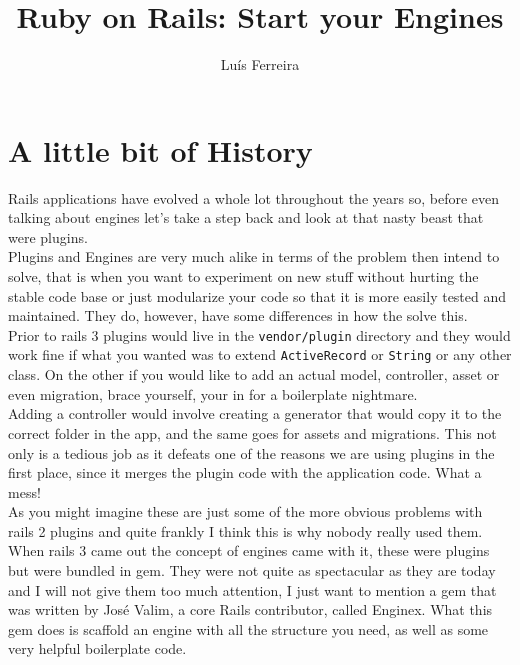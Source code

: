 \documentclass[12pt,a4paper,twoside]{book}
\begin{document}

\title{Ruby on Rails: Start your Engines}
\author{Luís Ferreira}

\maketitle

\tableofcontents
\newpage

\chapter{A little bit of History}
Rails applications have evolved a whole lot throughout the years so, before even talking about engines let's take a step back and look at that nasty beast that were plugins.\\

Plugins and Engines are very much alike in terms of the problem then intend to solve, that is when you want to experiment on new stuff without hurting the stable code base or just modularize your code so that it is more easily tested and maintained. They do, however, have some differences in how the solve this.\\

Prior to rails 3 plugins would live in the \verb=vendor/plugin= directory and they would work fine if what you wanted was to extend \verb=ActiveRecord= or \verb=String= or any other class. On the other if you would like to add an actual model, controller, asset or even migration, brace yourself, your in for a boilerplate nightmare.\\

Adding a controller would involve creating a generator that would copy it to the correct folder in the app, and the same goes for assets and migrations. This not only is a tedious job as it defeats one of the reasons we are using plugins in the first place, since it merges the plugin code with the application code. What a mess!\\

As you might imagine these are just some of the more obvious problems with rails 2 plugins and quite frankly I think this is why nobody really used them.\\

When rails 3 came out the concept of engines came with it, these were plugins but were bundled in gem. They were not quite as spectacular as they are today and I will not give them too much attention, I just want to mention a gem that was written by José Valim, a core Rails contributor, called Enginex. What this gem does is scaffold an engine with all the structure you need, as well as some very helpful boilerplate code.\\
\end{document}
